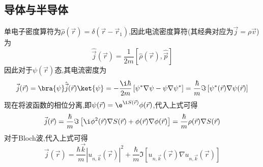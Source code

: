 \documentclass{ctexbook}
\begin{document}
\subsection{导体与半导体}
单电子密度算符为$\hat{\rho}(\vec{r})=\delta(\vec{r}-\vec{r}_1)$,因此电流密度算符(其经典对应为$\vec{j}=\rho\vec{v}$)为
\[\hat{{\vec{j}}}(\vec{r})=\dfrac{1}{2m}\left[\hat{\rho}(\vec{r}),\hat{\vec{p}}\right]\]
因此对于$\psi(\vec{r})$态,其电流密度为
\[\vec{j}(\vec{r})=\bra{\psi}\hat{\vec{j}}(\vec{r})\ket{\psi}=-\dfrac{\i\hbar}{2m}\left[\psi^\ast\nabla\psi-\psi\nabla\psi^\ast\right]=\dfrac{\hbar}{m}\Im\left[\psi^\ast(\vec{r})\nabla\psi(\vec{r})\right]\]
现在将波函数的相位分离,即$\psi(\vec{r})=\e^{\i S(\vec{r})}\phi(\vec{r})$,代入上式可得
\[\vec{j}(\vec{r})=\dfrac{\hbar}{m}\Im\left[\i\phi^2(\vec{r})\nabla S(\vec{r})+\phi(\vec{r})\nabla\phi(\vec{r})\right]=\dfrac{\hbar}{m}\rho(\vec{r})\nabla S(\vec{r})\]
对于Bloch波,代入上式可得
\[\vec{j}(\vec{r})=\dfrac{\hbar\vec{k}}{m}\left|u_{n,\vec{k}}(\vec{r})\right|^2+\dfrac{\hbar}{m}\Im\left[u_{n,\vec{k}}(\vec{r})\nabla u_{n,\vec{k}}(\vec{r})\right]\]
\end{document}
